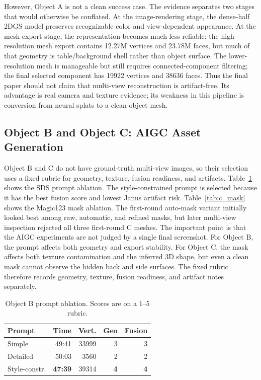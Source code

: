 \documentclass[10pt,twocolumn,letterpaper]{article}
\begin{document}
However, Object A is not a clean success case.
The evidence separates two stages that would otherwise be conflated.
At the image-rendering stage, the dense-half 2DGS model preserves recognizable color and view-dependent appearance.
At the mesh-export stage, the representation becomes much less reliable: the high-resolution mesh export contains 12.27M vertices and 23.78M faces, but much of that geometry is table/background shell rather than object surface.
The lower-resolution mesh is manageable but still requires connected-component filtering; the final selected component has 19922 vertices and 38636 faces.
Thus the final paper should not claim that multi-view reconstruction is artifact-free.
Its advantage is real camera and texture evidence; its weakness in this pipeline is conversion from neural splats to a clean object mesh.

\subsection{Object B and Object C: AIGC Asset Generation}
Object B and C do not have ground-truth multi-view images, so their selection uses a fixed rubric for geometry, texture, fusion readiness, and artifacts.
Table~\ref{tab:b_prompt} shows the SDS prompt ablation.
The style-constrained prompt is selected because it has the best fusion score and lowest Janus artifact risk.
Table~\ref{tab:c_mask} shows the Magic123 mask ablation.
The first-round auto-mask variant initially looked best among raw, automatic, and refined masks, but later multi-view inspection rejected all three first-round C meshes.
The important point is that the AIGC experiments are not judged by a single final screenshot.
For Object B, the prompt affects both geometry and export stability.
For Object C, the mask affects both texture contamination and the inferred 3D shape, but even a clean mask cannot observe the hidden back and side surfaces.
The fixed rubric therefore records geometry, texture, fusion readiness, and artifact notes separately.

\begin{table}[t]
\centering
\caption{Object B prompt ablation. Scores are on a 1--5 rubric.}
\label{tab:b_prompt}
\begin{tabular}{lrrrr}
\toprule
Prompt & Time & Vert. & Geo & Fusion \\
\midrule
Simple & 49:41 & 33999 & 3 & 3 \\
Detailed & 50:03 & 3560 & 2 & 2 \\
Style-constr. & \textbf{47:39} & 39314 & \textbf{4} & \textbf{4} \\
\bottomrule
\end{tabular}
\end{table}
\end{document}
